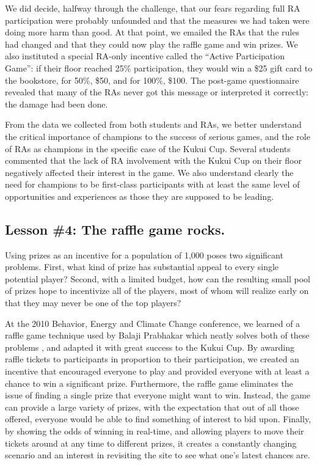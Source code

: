 \documentclass{acm_proc_article-sp}
\begin{document}
We did decide, halfway through the challenge, that our fears regarding full RA participation were probably unfounded and that the measures we had taken were doing more harm than good.  At that point, we emailed the RAs that the rules had changed and that they could now play the raffle game and win prizes.  We also instituted a special RA-only incentive called the ``Active Participation Game'':   if their floor reached 25\% participation, they would win a \$25 gift card to the bookstore, for 50\%, \$50, and for 100\%, \$100.   The post-game questionnaire revealed that many of the RAs never got this message or interpreted it correctly: the damage had been done.

From the data we collected from both students and RAs, we better understand the critical importance of champions to the success of serious games, and the role of RAs as champions in the specific case of the Kukui Cup.  Several students commented that the lack of RA involvement with the Kukui Cup on their floor negatively affected their interest in the game.  We also understand clearly the need for champions to be first-class participants with at least the same level of opportunities and experiences as those they are supposed to be leading.

\subsection{Lesson \#4: The raffle game rocks.}

Using prizes as an incentive for a population of 1,000 poses two significant problems.  First, what kind of prize has substantial appeal to every single potential player?  Second, with a limited budget, how can the resulting small pool of prizes hope to incentivize all of the players, most of whom will realize early on that they may never be one of the top players?

At the 2010 Behavior, Energy and Climate Change conference, we learned of a raffle game technique used by Balaji Prabhakar which neatly solves both of these problems \cite{Merugu2009}, and adapted it with great success to the Kukui Cup.  By awarding raffle tickets to participants in proportion to their participation, we created an incentive that encouraged everyone to play and provided everyone with at least a chance to win a significant prize.   Furthermore, the raffle game eliminates the issue of finding a single prize that everyone might want to win. Instead, the game can provide a large variety of prizes, with the expectation that out of all those offered, everyone would be able to find something of interest to bid upon.  Finally, by showing the odds of winning in real-time, and allowing players to move their tickets around at any time to different prizes, it creates a constantly changing scenario and an interest in revisiting the site to see what one's latest chances are. 
\end{document}
